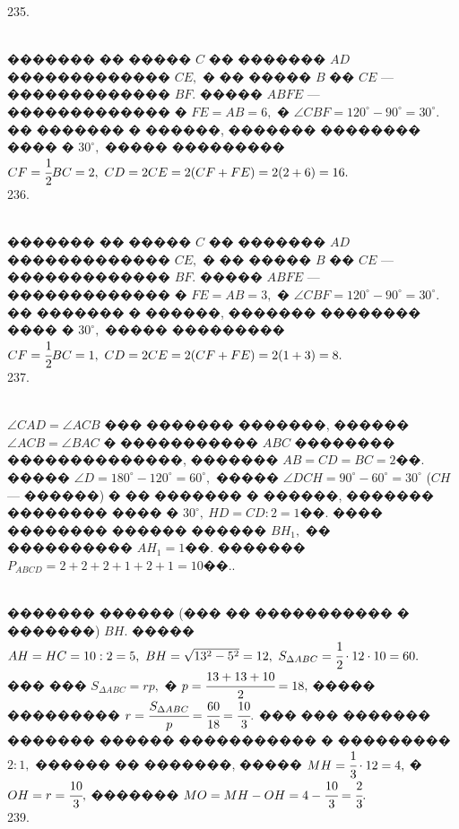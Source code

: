 \documentclass[12pt]{article}
\begin{document}
235. \begin{figure}[ht!]
\end{figure}\\
������� �� ����� $C$ �� ������� $AD$ ������������� $CE,$ � �� ����� $B$ �� $CE$ --- ������������� $BF.$ ����� $ABFE$ --- ������������� � $FE=AB=6,$ � $\angle CBF=  120^\circ-90^\circ=30^\circ.$ �� ������� � ������, ������� �������� ���� � $30^\circ,$ ����� ��������� $CF=\cfrac{1}{2}BC=2,\ CD=2CE=2(CF+FE)=2(2+6)=16.$\\
236. \begin{figure}[ht!]
\end{figure}\\
������� �� ����� $C$ �� ������� $AD$ ������������� $CE,$ � �� ����� $B$ �� $CE$ --- ������������� $BF.$ ����� $ABFE$ --- ������������� � $FE=AB=3,$ � $\angle CBF=  120^\circ-90^\circ=30^\circ.$ �� ������� � ������, ������� �������� ���� � $30^\circ,$ ����� ��������� $CF=\cfrac{1}{2}BC=1,\ CD=2CE=2(CF+FE)=2(1+3)=8.$\\
237. \begin{figure}[ht!]
\end{figure}\\
$\angle CAD=\angle ACB$ ��� ������� �������, ������ $\angle ACB=\angle BAC$ � ����������� $ABC$ �������� ��������������, ������� $AB=CD=BC=2$��. ����� $\angle D=180^\circ-120^\circ=60^\circ,$ ����� $\angle DCH=90^\circ-60^\circ=30^\circ$ ($CH$ --- ������) � �� ������� � ������, ������� �������� ���� � $30^\circ,\ HD=CD:2=1$��. ���� �������� ������ ������ $BH_1,$ �� ���������� $AH_1=1$��. ������� $P_{ABCD}=2+2+2+1+2+1=10$��.\newpage{}. \begin{figure}[ht!]
\end{figure}\\
������� ������ (��� �� ����������� � �������) $BH.$ ����� $AH=HC=10:2=5,\ BH=\sqrt{13^2-5^2}=12,\ S_{\Delta ABC}=\cfrac{1}{2}\cdot12\cdot10=60.$ ��� ��� $S_{\Delta ABC}=rp,$ � $p=\cfrac{13+13+10}{2}=18,$ ����� ��������� $r=\cfrac{S_{\Delta ABC}}{p}=\cfrac{60}{18}=\cfrac{10}{3}.$ ��� ��� ������� ������� ������ ����������� � ��������� $2:1,$ ������ �� �������, ����� $MH=\cfrac{1}{3}\cdot12=4,$ � $OH=r=\cfrac{10}{3},$ ������� $MO=MH-OH=4-\cfrac{10}{3}=\cfrac{2}{3}.$\\
239. \begin{figure}[ht!]
\end{figure}\\
\end{document}
